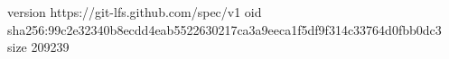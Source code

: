 version https://git-lfs.github.com/spec/v1
oid sha256:99c2e32340b8ecdd4eab5522630217ca3a9eeca1f5df9f314c33764d0fbb0dc3
size 209239
